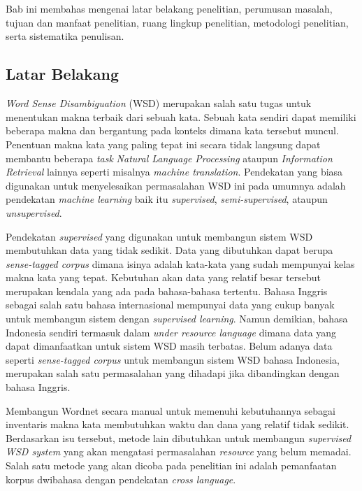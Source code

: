\chapter{\babSatu}
Bab ini membahas mengenai latar belakang penelitian, perumusan masalah, tujuan dan manfaat penelitian, ruang lingkup penelitian, metodologi penelitian, serta sistematika penulisan.

\section{Latar Belakang}

\textit{Word Sense Disambiguation} (WSD) merupakan salah satu tugas untuk menentukan makna terbaik dari sebuah kata. Sebuah kata sendiri dapat memiliki beberapa makna dan bergantung pada konteks dimana kata tersebut muncul. Penentuan makna kata yang paling tepat ini secara tidak langsung dapat membantu beberapa \textit{task} \textit{Natural Language Processing} ataupun \textit{Information Retrieval} lainnya seperti misalnya \textit{machine translation}. Pendekatan yang biasa digunakan untuk menyelesaikan permasalahan WSD ini pada umumnya adalah pendekatan \textit{machine learning} baik itu \textit{supervised}, \textit{semi-supervised}, ataupun \textit{unsupervised}.

Pendekatan \textit{supervised} yang digunakan untuk membangun sistem WSD membutuhkan data yang tidak sedikit. Data yang dibutuhkan dapat berupa \textit{sense-tagged corpus} dimana isinya adalah kata-kata yang sudah mempunyai kelas makna kata yang tepat. Kebutuhan akan data yang relatif besar tersebut merupakan kendala yang ada pada bahasa-bahasa tertentu. Bahasa Inggris sebagai salah satu bahasa internasional mempunyai data yang cukup banyak untuk membangun sistem dengan \textit{supervised learning}. Namun demikian, bahasa Indonesia sendiri termasuk dalam \textit{under resource language} dimana data yang dapat dimanfaatkan untuk sistem WSD masih terbatas. Belum adanya data seperti \textit{sense-tagged corpus} untuk membangun sistem WSD bahasa Indonesia, merupakan salah satu permasalahan yang dihadapi jika dibandingkan dengan bahasa Inggris.

Membangun Wordnet secara manual untuk memenuhi kebutuhannya sebagai inventaris makna kata membutuhkan waktu dan dana yang relatif tidak sedikit. Berdasarkan isu tersebut, metode lain dibutuhkan untuk membangun \textit{supervised WSD system} yang akan mengatasi permasalahan \textit{resource} yang belum memadai. Salah satu metode yang akan dicoba pada penelitian ini adalah pemanfaatan korpus dwibahasa dengan pendekatan \textit{cross language}.

